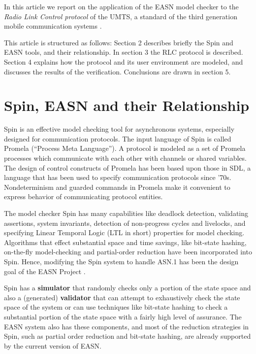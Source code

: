 \documentclass{entcs} \usepackage{entcsmacro}
\begin{document}
In this article we report on the application of the EASN model checker to
the {\em Radio Link Control protocol} \cite{3g-RLC} of the UMTS, a
standard of the third generation mobile communication systems
\cite{3gviite}.

This article is structured as follows: Section 2 describes briefly the
Spin and EASN tools, and their relationship. In section 3 the RLC protocol
is described. Section 4 explains how the protocol and its user
environment are modeled, and discusses the results of the
verification. Conclusions are drawn in section 5.

\section{Spin, EASN and their Relationship}

Spin \cite{Spin} is an effective model checking tool for asynchronous systems,
especially designed for communication protocols. The input language of Spin 
is called Promela (``Process Meta Language''). A protocol is modeled as a set 
of Promela processes which communicate with each other with channels or 
shared variables. The design of control constructs of Promela has been based 
upon those in SDL, a language that has been used to specify communication 
protocols since '70s. Nondeterminism and guarded commands in Promela make 
it convenient to express behavior of communicating protocol entities.  

The model checker Spin has many capabilities like deadlock detection,
validating assertions, system invariants, detection of non-progress
cycles and livelocks, and specifying Linear Temporal Logic (LTL in
short) properties for model checking.  Algorithms that effect
substantial space and time savings, like bit-state hashing, on-the-fly
model-checking and partial-order reduction have been incorporated into
Spin. Hence, modifying the Spin system to handle ASN.1 has been the
design goal of the EASN Project \cite{easncav}.

Spin has a {\bf simulator} that randomly checks only a portion of the
state space and also a (generated) {\bf validator} that can attempt to
exhaustively check the state space of the system or can use techniques
like bit-state hashing to check a substantial portion of the state
space with a fairly high level of assurance. The EASN system also has
these components, and most of the reduction strategies in Spin, such
as partial order reduction and bit-state hashing, are already
supported by the current version of EASN.
\end{document}
